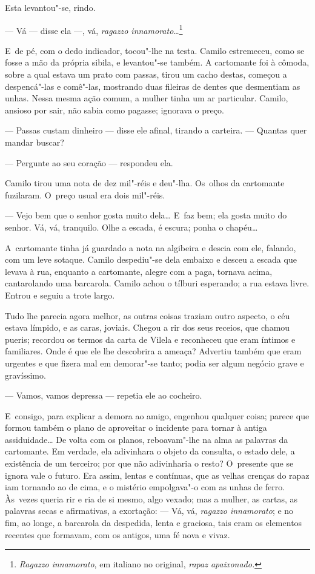 \begin{linenumbers}
Esta levantou"-se, rindo.

--- Vá --- disse ela ---, vá, \emph{ragazzo innamorato}\ldots{}\footnote{\emph{Ragazzo
  innamorato}, em italiano no original, \emph{rapaz apaixonado. }}

E~de pé, com o dedo indicador, tocou"-lhe na testa. Camilo estremeceu,
como se fosse a mão da própria sibila, e levantou"-se também. A
cartomante foi à cômoda, sobre a qual estava um prato com passas, tirou
um cacho destas, começou a despencá"-las e comê"-las, mostrando duas
fileiras de dentes que desmentiam as unhas. Nessa mesma ação comum, a
mulher tinha um ar particular. Camilo, ansioso por sair, não sabia como
pagasse; ignorava o preço.

--- Passas custam dinheiro --- disse ele afinal, tirando a carteira. ---
Quantas quer mandar buscar?

--- Pergunte ao seu coração --- respondeu ela.

Camilo tirou uma nota de dez mil"-réis e deu"-lha. Os~olhos da cartomante
fuzilaram. O~preço usual era dois mil"-réis.

--- Vejo bem que o senhor gosta muito dela\ldots{} E~faz bem; ela gosta muito
do senhor. Vá, vá, tranquilo. Olhe a escada, é escura; ponha o chapéu\ldots{}

A~cartomante tinha já guardado a nota na algibeira e descia com ele,
falando, com um leve sotaque. Camilo despediu"-se dela embaixo e desceu a
escada que levava à rua, enquanto a cartomante, alegre com a paga,
tornava acima, cantarolando uma barcarola. Camilo achou o tílburi
esperando; a rua estava livre. Entrou e seguiu a trote largo.

Tudo lhe parecia agora melhor, as outras coisas traziam outro aspecto, o
céu estava límpido, e as caras, joviais. Chegou a rir dos seus receios,
que chamou pueris; recordou os termos da carta de Vilela e reconheceu
que eram íntimos e familiares. Onde é que ele lhe descobrira a ameaça?
Advertiu também que eram urgentes e que fizera mal em demorar"-se tanto;
podia ser algum negócio grave e gravíssimo.

--- Vamos, vamos depressa --- repetia ele ao cocheiro.

E~consigo, para explicar a demora ao amigo, engenhou qualquer coisa;
parece que formou também o plano de aproveitar o incidente para tornar à
antiga assiduidade\ldots{} De volta com os planos, reboavam"-lhe na alma as
palavras da cartomante. Em verdade, ela adivinhara o objeto da consulta,
o estado dele, a existência de um terceiro; por que não adivinharia o
resto? O~presente que se ignora vale o futuro. Era assim, lentas e
contínuas, que as velhas crenças do rapaz iam tornando ao de cima, e o
mistério empolgava"-o com as unhas de ferro. Às~vezes queria rir e ria de
si mesmo, algo vexado; mas a mulher, as cartas, as palavras secas e
afirmativas, a exortação: --- Vá, vá, \emph{ragazzo innamorato}; e no
fim, ao longe, a barcarola da despedida, lenta e graciosa, tais eram os
elementos recentes que formavam, com os antigos, uma fé nova e vivaz.


\end{linenumbers}

